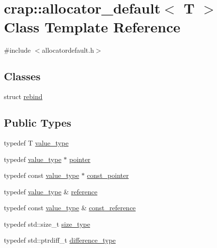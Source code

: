 \hypertarget{classcrap_1_1allocator__default}{\section{crap\-:\-:allocator\-\_\-default$<$ T $>$ Class Template Reference}
\label{classcrap_1_1allocator__default}
}


{\ttfamily \#include $<$allocatordefault.\-h$>$}

\subsection*{Classes}
\begin{DoxyCompactItemize}
\item 
struct \hyperlink{structcrap_1_1allocator__default_1_1rebind}{rebind}
\end{DoxyCompactItemize}
\subsection*{Public Types}
\begin{DoxyCompactItemize}
\item 
typedef T \hyperlink{classcrap_1_1allocator__default_ac3902c99d9b046ca1e35bba0d6f63dc9}{value\-\_\-type}
\item 
typedef \hyperlink{classcrap_1_1allocator__default_ac3902c99d9b046ca1e35bba0d6f63dc9}{value\-\_\-type} $\ast$ \hyperlink{classcrap_1_1allocator__default_a10c26486aa6c8e7b9b1cb7fa1a10b3bd}{pointer}
\item 
typedef const \hyperlink{classcrap_1_1allocator__default_ac3902c99d9b046ca1e35bba0d6f63dc9}{value\-\_\-type} $\ast$ \hyperlink{classcrap_1_1allocator__default_af76e09c744d25c384dd12e3353c60733}{const\-\_\-pointer}
\item 
typedef \hyperlink{classcrap_1_1allocator__default_ac3902c99d9b046ca1e35bba0d6f63dc9}{value\-\_\-type} \& \hyperlink{classcrap_1_1allocator__default_a58372b140fc5c63e4be9ce32b93ec942}{reference}
\item 
typedef const \hyperlink{classcrap_1_1allocator__default_ac3902c99d9b046ca1e35bba0d6f63dc9}{value\-\_\-type} \& \hyperlink{classcrap_1_1allocator__default_a8d3c37bc5001cad948974ad3a0faade5}{const\-\_\-reference}
\item 
typedef std\-::size\-\_\-t \hyperlink{classcrap_1_1allocator__default_aec0689db195f5f8ce40f789b17ab4d55}{size\-\_\-type}
\item 
typedef std\-::ptrdiff\-\_\-t \hyperlink{classcrap_1_1allocator__default_ae3cf087b680d11388559e3cbc5ab3bbc}{difference\-\_\-type}
\end{DoxyCompactItemize}
